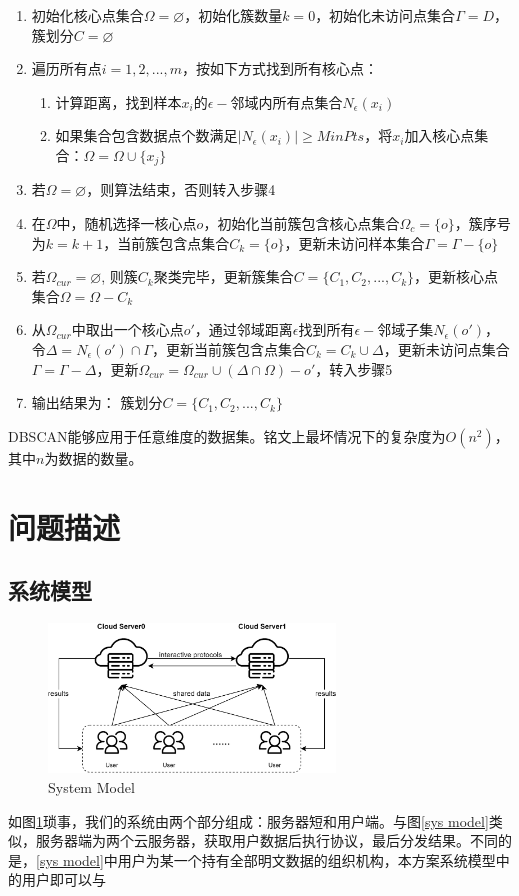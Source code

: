 \begin{enumerate}
	\item 初始化核心点集合$ \Omega = \varnothing  $，初始化簇数量$ k=0 $，初始化未访问点集合$ \Gamma = D $，簇划分$ C=\varnothing $
	\item 遍历所有点$ i=1,2,...,m $，按如下方式找到所有核心点：
	\begin{enumerate}
	\item 计算距离，找到样本$ x_i $的$ \epsilon- $邻域内所有点集合$ N_{\epsilon}(x_i) $
	\item 如果集合包含数据点个数满足$ |N_{\epsilon}(x_i)| \geq MinPts $，将$ x_i $加入核心点集合：$ \Omega = \Omega \cup \{x_j\} $
	\end{enumerate}	
	\item 若$ \Omega = \varnothing $，则算法结束，否则转入步骤4
	\item 在$ \Omega $中，随机选择一核心点$ o $，初始化当前簇包含核心点集合$ \Omega_{c}=\{o\} $，簇序号为$ k=k+1 $，当前簇包含点集合$ C_k=\{o\} $，更新未访问样本集合$ \Gamma = \Gamma - \{o\} $
	\item 若$ \Omega_{cur} = \varnothing $, 则簇$ C_k $聚类完毕，更新簇集合$ C=\{C_1,C_2,...,C_k\} $，更新核心点集合$ \Omega = \Omega - C_k $
	\item 从$ \Omega_{cur} $中取出一个核心点$ o' $，通过邻域距离$ \epsilon $找到所有$ \epsilon- $邻域子集$ N_{\epsilon}(o')  $，令$ \Delta = N_{\epsilon}(o') \cap \Gamma $，更新当前簇包含点集合$ C_k = C_k \cup \Delta $，更新未访问点集合$ \Gamma = \Gamma - \Delta $，更新$ \Omega_{cur} = \Omega_{cur}\cup(\Delta\cap\Omega)-o' $，转入步骤5
	\item 输出结果为： 簇划分$ C=\{C_1,C_2,...,C_k\} $
\end{enumerate}

DBSCAN能够应用于任意维度的数据集。铭文上最坏情况下的复杂度为$ O(n^2) $，其中$ n $为数据的数量。
\section{问题描述}
\label{s4-wenti}
\subsection{系统模型}
\begin{figure}[htbp]
	\centering
	\includegraphics[width=3in]{img/ch4-sysmod.png}%
	\caption{System Model}
	\label{s4-sysmod}
\end{figure}
如图\ref{s4-sysmod}琐事，我们的系统由两个部分组成：服务器短和用户端。与图\ref{sys model}类似，服务器端为两个云服务器，获取用户数据后执行协议，最后分发结果。不同的是，\ref{sys model}中用户为某一个持有全部明文数据的组织机构，本方案系统模型中的用户即可以与
